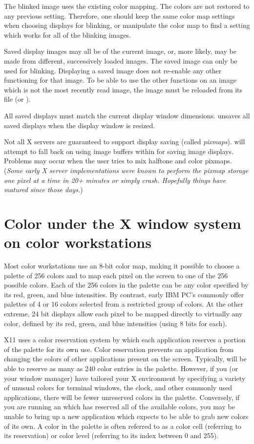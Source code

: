 The blinked image uses the existing color mapping.  The colors are
not restored to any previous setting.  Therefore, one should keep
the same color map settings when choosing displays for blinking,
or manipulate the color map to find a setting which works for all
of the blinking images.

Saved display images may all be of the current image, or, more
likely, may be made from different, successively loaded images.
The saved image can only be used for blinking.  Displaying a
saved image does not re-enable any other {\SAO} functioning
for that image.  To be able to use the other functions on an
image which is not the most recently read image, the image must
be reloaded from its file (or {\IRAF}).

All saved displays must match the current display window dimensions.
{\SAO} unsaves all saved displays when the display window is
resized.

Not all X servers are guaranteed to support display saving (called
{\em pixmaps}).  {\SAO} will attempt to fall back on using image
buffers within {\SAO} for saving image displays.  Problems may occur
when the user tries to mix halftone and color pixmaps.  ({\em Some early X
server implementations were known to perform the pixmap storage one
pixel at a time in 20+ minutes or simply crash.  Hopefully things
have matured since those days.})

\section{Color under the X window system on color workstations}
\label{color-sec}

Most color workstations use an 8-bit color map, making it possible to
choose a palette of 256 colors and to map each pixel on the screen to
one of the 256 possible colors.  Each of the 256 colors in the palette
can be any color specified by its red, green, and blue intensities. By
contrast, early IBM PC's commonly offer palettes of 4 or 16 colors selected
from a restricted group of colors.  At the other extreme, 24 bit
displays allow each pixel to be mapped directly to virtually any color,
defined by its red, green, and blue intensities (using 8 bits for each).

X11 uses a color reservation system by which each application reserves a
portion of the palette for its own use.  Color reservation prevents an
application from changing the colors of other applications present on the
screen.  Typically, {\SAO} will be able to reserve as many as 240 color
entries in the palette.  However, if you (or your window manager) have
tailored your X environment by specifying a variety of unusual colors for
terminal windows, the clock, and other commonly used applications, there
will be fewer unreserved colors in the palette.  Conversely, if you are
running an {\SAO} which has reserved all of the available colors, you
may be unable to bring up a new application which expects to be able to
grab new colors of its own.  A color in the palette is often referred to
as a color cell (referring to its reservation) or color level (referring
to its index between 0 and 255).

